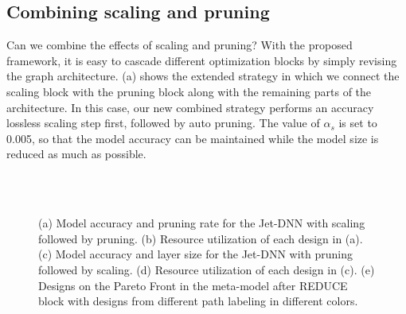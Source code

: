 \subsection{Combining scaling and pruning}\label{sec:scaling_pruning}

Can we combine the effects of scaling and pruning? 
With the proposed framework, it is easy to cascade different optimization blocks by simply revising the graph architecture. (a) shows the extended strategy in which we connect the scaling block with the pruning block along with the remaining parts of the architecture.
In this case, our new combined strategy performs an accuracy lossless scaling step first, followed by auto pruning. The value of $\alpha_s$ is set to 0.005, so that the model accuracy can be maintained while the model size is reduced as much as possible. 


\begin{figure} 
   \centering
   \hspace*{\fill}
  \\
   \hspace*{\fill}
  \\
  \caption{(a) Model accuracy and pruning rate for the Jet-DNN with scaling followed by pruning. (b) Resource utilization of each design in (a). (c) Model accuracy and layer size for the Jet-DNN with pruning followed by scaling. (d) Resource utilization of each design in (c). (e) Designs on the Pareto Front in the meta-model after REDUCE block with designs from different path labeling in different colors. }
  \label{fig:scaling_pruning_results} 
\end{figure}


